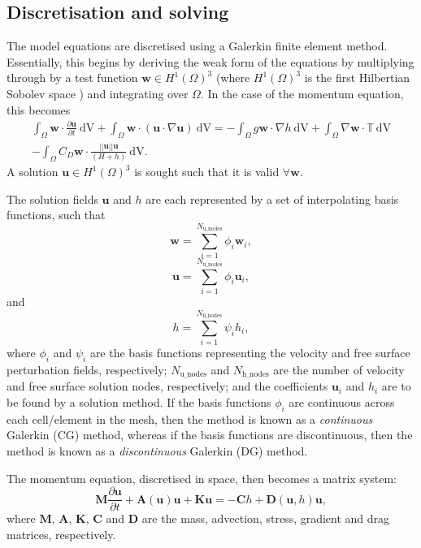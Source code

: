 \documentclass[a4paper,11pt]{report}
\begin{document}
\subsection{Discretisation and solving}
The model equations are discretised using a Galerkin finite element method. Essentially, this begins by deriving the weak form of the equations by multiplying through by a test function $\mathbf{w} \in H^1(\Omega)^3$ (where $H^1(\Omega)^3$ is the first Hilbertian Sobolev space \citep{Elman_etal_2005}) and integrating over $\Omega$. In the case of the momentum equation, this becomes
\begin{eqnarray}
   \nonumber\int_{\Omega}\mathbf{w}\cdot\frac{\partial \mathbf{u}}{\partial t}\ \mathrm{dV} + \int_{\Omega}\mathbf{w}\cdot(\mathbf{u}\cdot\nabla\mathbf{u}) \ \mathrm{dV} = -\int_{\Omega}g\mathbf{w}\cdot\nabla h \ \mathrm{dV} + \int_{\Omega}\nabla\mathbf{w}\cdot \mathbb{T} \ \mathrm{dV} \\- \int_{\Omega}C_D\mathbf{w}\cdot\frac{||\mathbf{u}||\mathbf{u}}{(H + h)} \ \mathrm{dV}.
\end{eqnarray}
A solution $\mathbf{u} \in H^1(\Omega)^3$ is sought such that it is valid $\forall \mathbf{w}$.

The solution fields $\mathbf{u}$ and $h$ are each represented by a set of interpolating basis functions, such that
\begin{equation}
   \mathbf{w} = \sum_{i=1}^{N_\mathrm{u\_nodes}} \phi_i\mathbf{w}_i,
\end{equation}
\begin{equation}
   \mathbf{u} = \sum_{i=1}^{N_\mathrm{u\_nodes}} \phi_i\mathbf{u}_i,
\end{equation}
and
\begin{equation}
   h = \sum_{i=1}^{N_\mathrm{h\_nodes}} \psi_ih_i,
\end{equation}
where $\phi_i$ and $\psi_i$ are the basis functions representing the velocity and free surface perturbation fields, respectively; $N_\mathrm{u\_nodes}$ and $N_\mathrm{h\_nodes}$ are the number of velocity and free surface solution nodes, respectively; and the coefficients $\mathbf{u}_i$ and $h_i$ are to be found by a solution method. If the basis functions $\phi_i$ are continuous across each cell/element in the mesh, then the method is known as a \textit{continuous} Galerkin (CG) method, whereas if the basis functions are discontinuous, then the method is known as a \textit{discontinuous} Galerkin (DG) method.

The momentum equation, discretised in space, then becomes a matrix system:
\begin{equation}
   \mathbf{M}\frac{\partial\mathbf{u}}{\partial t} + \mathbf{A}(\mathbf{u})\mathbf{u} + \mathbf{K}\mathbf{u} = -\mathbf{C}h + \mathbf{D}(\mathbf{u}, h)\mathbf{u},
\end{equation}
where $\mathbf{M}$, $\mathbf{A}$, $\mathbf{K}$, $\mathbf{C}$ and $\mathbf{D}$ are the mass, advection, stress, gradient and drag matrices, respectively.
\end{document}

